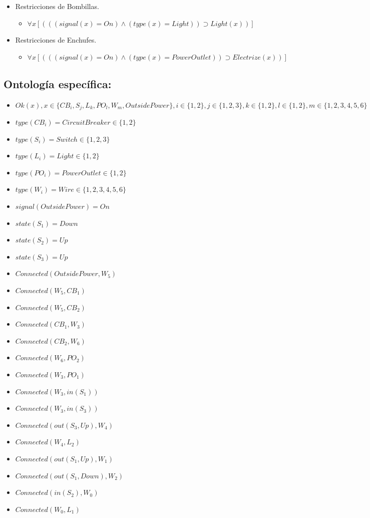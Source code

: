 \documentclass[10pt, a4paper,spanish]{article}
\begin{document}
\begin{itemize}
				\item Restricciones de Bombillas.
				\begin{itemize}
					\item$ \forall x [(((signal(x) = On) \land (type(x) = Light) )  \supset Light(x))] $
				\end{itemize}

				\item Restricciones de Enchufes.
				\begin{itemize}
					\item$ \forall x [(((signal(x) = On) \land (type(x) = PowerOutlet) )  \supset Electrize(x))] $
				\end{itemize}
			\end{itemize}

		\subsection{Ontología específica:}

			\begin{itemize}
				\item $ Ok(x),  x \in \{CB_i, S_j, L_k, PO_l, W_m, OutsidePower\}, i \in \{1,2\}, j \in \{1,2,3\},k \in \{1,2\},l \in \{1,2\},m \in \{1,2,3,4,5,6\}$
				\item $ type(CB_i) = CircuitBreaker \in \{1,2\} $
				\item $ type(S_i) = Switch \in \{1,2, 3\} $
				\item $ type(L_i) = Light \in \{1,2\} $
				\item $ type(PO_i) = PowerOutlet \in \{1,2\} $
				\item $ type(W_i) = Wire \in \{1,2, 3, 4, 5, 6\} $
				\item $ signal(OutsidePower) = On $
				\item $ state(S_1) = Down $
				\item $ state(S_2) = Up $
				\item $ state(S_3) = Up $
				\item $ Connected(OutsidePower, W_5)$
				\item $ Connected(W_5, CB_1)$
				\item $ Connected(W_5, CB_2)$
				\item $ Connected(CB_1, W_3)$
				\item $ Connected(CB_2, W_6)$
				\item $ Connected(W_6, PO_2)$
				\item $ Connected(W_3, PO_1)$
				\item $ Connected(W_3, in(S_1))$
				\item $ Connected(W_3, in(S_3))$
				\item $ Connected(out(S_3, Up), W_4)$
				\item $ Connected(W_4, L_2)$
				\item $ Connected(out(S_1, Up), W_1)$
				\item $ Connected(out(S_1, Down), W_2)$
				\item $ Connected(in(S_2), W_0)$
				\item $ Connected(W_0, L_1)$
			\end{itemize}
\end{document}
